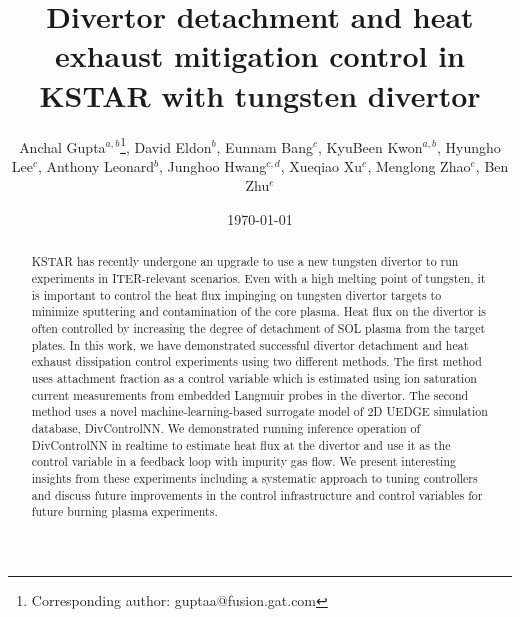 \documentclass[10pt]{iopart}
\def\GA{General Atomics, 3550 General Atomics Ct., San Diego, CA 92121, USA}
\def\ORAU{Oak Ridge Associated Universities, 100 ORAU Way, Oak Ridge, TN 37830, USA}
\def\LLNL{Lawrence Livermore National Laboratory, PO Box 808, Livermore, CA 94550, USA}
\def\KFE{Korea Institute of Fusion Energy, 169-148 Gwahak-ro, Yuseong-gu, Daejeon 34133, Republic of Korea}
\def\KAIST{Korea Advanced Institute of Science and Technology, 291 Daehak-ro, Yuseong-gu, Daejeon 34141, Republic of Korea}
\begin{document}
\title{Divertor detachment and heat exhaust mitigation control in KSTAR with tungsten divertor}

\author{
    Anchal Gupta$^{a, b}$\footnote{Corresponding author: guptaa@fusion.gat.com},
    David Eldon$^b$, 
    Eunnam Bang$^c$, 
    KyuBeen Kwon$^{a, b}$, 
    Hyungho Lee$^c$, 
    Anthony Leonard$^b$, 
    Junghoo Hwang$^{c, d}$, 
    Xueqiao Xu$^e$, 
    Menglong Zhao$^e$, 
    Ben Zhu$^e$
}

\address{$^a$\ORAU}
\address{$^b$\GA}
\address{$^c$\KFE}
\address{$^d$\KAIST}
\address{$^e$\LLNL}

\date{\today}

\begin{abstract}
KSTAR has recently undergone an upgrade to use a new tungsten divertor to run experiments in ITER-relevant scenarios.
Even with a high melting point of tungsten, it is important to control the heat flux impinging on tungsten divertor targets to minimize sputtering and contamination of the core plasma.
Heat flux on the divertor is often controlled by increasing the degree of detachment of \ac{SOL} plasma from the target plates.
In this work, we have demonstrated successful divertor detachment and heat exhaust dissipation control experiments using two different methods.
The first method uses attachment fraction as a control variable which is estimated using ion saturation current measurements from embedded Langmuir probes in the divertor.
The second method uses a novel machine-learning-based surrogate model of 2D UEDGE simulation database, DivControlNN.
We demonstrated running inference operation of DivControlNN in realtime to estimate heat flux at the divertor and use it as the control variable in a feedback loop with impurity gas flow.
We present interesting insights from these experiments including a systematic approach to tuning controllers and discuss future improvements in the control infrastructure and control variables for future burning plasma experiments.
\end{abstract}

\submitto{\PPCF}

\maketitle

\ioptwocol

\acresetall  %
\end{document}
